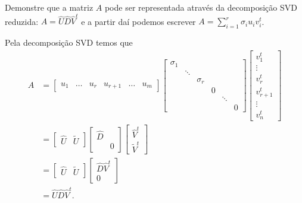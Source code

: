 \documentclass[a4paper,12pt, leqno, answers]{exam}
\begin{document}
\begin{questions}
    \question Demonstre que a matriz $A$ pode ser representada atrav\'{e}s da decomposi\c{c}\~{a}o SVD reduzida: $A = \hat{U} \hat{D} \hat{V}^t$ e a partir da\'{i} podemos escrever $A = \sum_{i = 1}^r \sigma_i u_i v_i^t$.
    \begin{solution}
        Pela decomposi\c{c}\~{a}o SVD temos que
        \begin{align*}
            A &= \begin{bmatrix}
                u_1 & \ldots & u_r & u_{r + 1} & \ldots & u_m
            \end{bmatrix} \begin{bmatrix}
                \sigma_1 \\
                & \ddots \\
                & & \sigma_r \\
                & & & 0 \\
                & & & & \ddots \\
                & & & & & 0
            \end{bmatrix} \begin{bmatrix}
                v_1^t \\
                \vdots \\
                v_r^t \\
                v_{r + 1}^t \\
                \vdots \\
                v_n^t
            \end{bmatrix} \\
            &= \begin{bmatrix}
                \hat{U} & \tilde{U}
            \end{bmatrix} \begin{bmatrix}
                \hat{D} & \\
                & 0
            \end{bmatrix} \begin{bmatrix}
                \hat{V}^t \\
                \tilde{V}^t
            \end{bmatrix} \\
            &= \begin{bmatrix}
                \hat{U} & \tilde{U}
            \end{bmatrix} \begin{bmatrix}
                \hat{D} \hat{V}^t \\
                0
            \end{bmatrix} \\
            &= \hat{U} \hat{D} \hat{V}^t.
        \end{align*}


\end{solution}
\end{questions}
\end{document}
